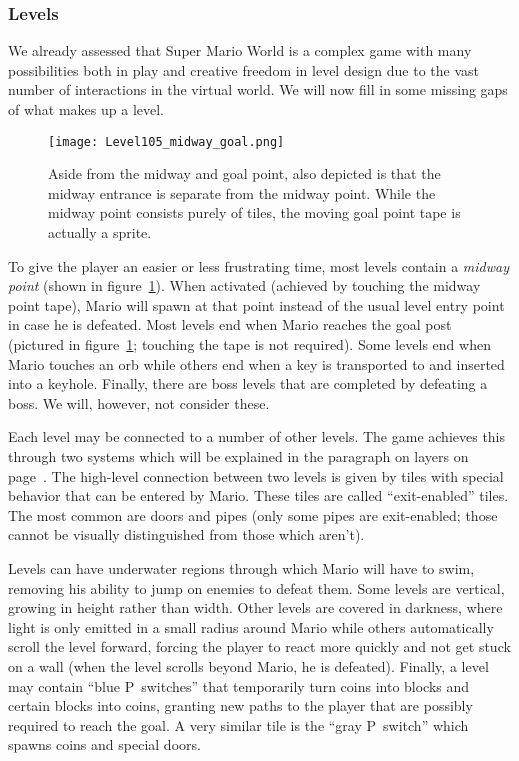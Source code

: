 \subsubsection{Levels}
\label{sec:levels}

We already assessed that Super Mario World is a complex game with many
possibilities both in play and creative freedom in level design due to
the vast number of interactions in the virtual world. We will now fill
in some missing gaps of what makes up a level.

\begin{figure}[t]
  \centering
  \texttt{[image: Level105\_midway\_goal.png]}
  \caption{Aside from the midway and goal point, also depicted is that
    the midway entrance is separate from the midway point. While the
    midway point consists purely of tiles, the moving goal point tape
    is actually a sprite.}
  \label{fig:midway-goal}
\end{figure}

To give the player an easier or less frustrating time, most levels
contain a \emph{midway point} (shown in figure~\ref{fig:midway-goal}).
When activated (achieved by touching the midway point tape), Mario
will spawn at that point instead of the usual level entry point in
case he is defeated. Most levels end when Mario reaches the goal post
(pictured in figure~\ref{fig:midway-goal}; touching the tape is not
required). Some levels end when Mario touches an orb while others end
when a key is transported to and inserted into a keyhole. Finally,
there are boss levels that are completed by defeating a boss. We will,
however, not consider these.

Each level may be connected to a number of other levels. The game
achieves this through two systems which will be explained in the
paragraph on layers on page~\pageref{par:layers}. The high-level
connection between two levels is given by tiles with special behavior
that can be entered by Mario. These tiles are called ``exit-enabled''
tiles. The most common are doors and pipes (only some pipes are
exit-enabled; those cannot be visually distinguished from those which
aren't).

Levels can have underwater regions through which Mario will have to
swim, removing his ability to jump on enemies to defeat them. Some
levels are vertical, growing in height rather than width. Other levels
are covered in darkness, where light is only emitted in a small radius
around Mario while others automatically scroll the level forward,
forcing the player to react more quickly and not get stuck on a wall
(when the level scrolls beyond Mario, he is defeated). Finally, a
level may contain ``blue P~switches'' that temporarily turn coins into
blocks and certain blocks into coins, granting new paths to the player
that are possibly required to reach the goal. A very similar tile is
the ``gray P~switch'' which spawns coins and special doors.

